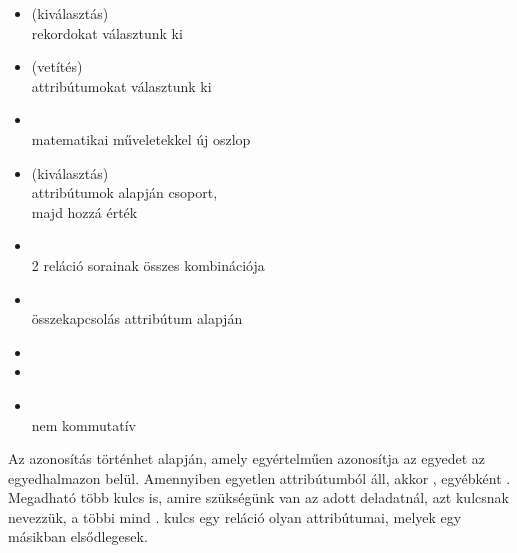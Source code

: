 \documentclass[main.tex]{subfiles}
\begin{document}
  \vspace{1em}
  \begin{minipage}[t]{0.5\textwidth}
    \begin{itemize}
      \item {} (kiválasztás) \\
      \tabto{5mm} rekordokat választunk ki
      
      \item {} (vetítés) \\
      \tabto{5mm} attribútumokat választunk ki

      \item {} \\
      \tabto{5mm} matematikai műveletekkel új oszlop

      \item {} (kiválasztás) \\
      \tabto{5mm} attribútumok alapján csoport, \\
      \tabto{5mm} majd hozzá érték
    \end{itemize}
  \end{minipage}\hfill
  \begin{minipage}[t]{0.5\textwidth}
    \begin{itemize}
      \item {} \\
      \tabto{5mm} 2 reláció sorainak összes kombinációja

      \item {} \\
      \tabto{5mm} összekapcsolás attribútum alapján

      \item {}

      \item {}

      \item {} \\
      \tabto{5mm} nem kommutatív
    \end{itemize}
  \end{minipage}

  Az azonosítás történhet  alapján,
  amely egyértelműen azonosítja az egyedet az egyedhalmazon belül.
  Amennyiben egyetlen attribútumból áll, akkor ,
  egyébként .
  Megadható több kulcs is, amire szükségünk van az adott
  deladatnál, azt  kulcsnak nevezzük,
  a többi mind .  kulcs egy
  reláció olyan attribútumai, melyek egy másikban elsődlegesek.
\end{document}
